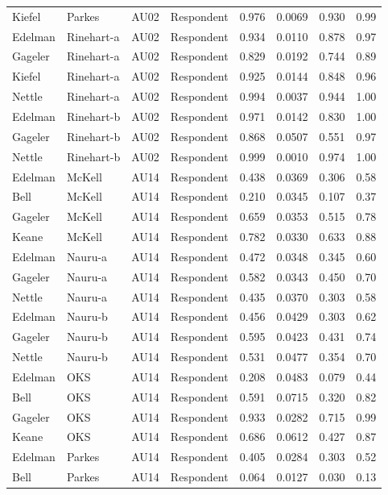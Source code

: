 \documentclass{monashthesis}
\begin{document}
\begin{center}
\begin{longtable}{llllllll}
Kiefel & Parkes & AU02 & Respondent & 0.976 & 0.0069 & 0.930 & 0.99 \\
Edelman & Rinehart-a & AU02 & Respondent & 0.934 & 0.0110 & 0.878 & 0.97 \\
Gageler & Rinehart-a & AU02 & Respondent & 0.829 & 0.0192 & 0.744 & 0.89 \\
Kiefel & Rinehart-a & AU02 & Respondent & 0.925 & 0.0144 & 0.848 & 0.96 \\
Nettle & Rinehart-a & AU02 & Respondent & 0.994 & 0.0037 & 0.944 & 1.00 \\
Edelman & Rinehart-b & AU02 & Respondent & 0.971 & 0.0142 & 0.830 & 1.00 \\
Gageler & Rinehart-b & AU02 & Respondent & 0.868 & 0.0507 & 0.551 & 0.97 \\
Nettle & Rinehart-b & AU02 & Respondent & 0.999 & 0.0010 & 0.974 & 1.00 \\
Edelman & McKell & AU14 & Respondent & 0.438 & 0.0369 & 0.306 & 0.58 \\
Bell & McKell & AU14 & Respondent & 0.210 & 0.0345 & 0.107 & 0.37 \\
Gageler & McKell & AU14 & Respondent & 0.659 & 0.0353 & 0.515 & 0.78 \\
Keane & McKell & AU14 & Respondent & 0.782 & 0.0330 & 0.633 & 0.88 \\
Edelman & Nauru-a & AU14 & Respondent & 0.472 & 0.0348 & 0.345 & 0.60 \\
Gageler & Nauru-a & AU14 & Respondent & 0.582 & 0.0343 & 0.450 & 0.70 \\
Nettle & Nauru-a & AU14 & Respondent & 0.435 & 0.0370 & 0.303 & 0.58 \\
Edelman & Nauru-b & AU14 & Respondent & 0.456 & 0.0429 & 0.303 & 0.62 \\
Gageler & Nauru-b & AU14 & Respondent & 0.595 & 0.0423 & 0.431 & 0.74 \\
Nettle & Nauru-b & AU14 & Respondent & 0.531 & 0.0477 & 0.354 & 0.70 \\
Edelman & OKS & AU14 & Respondent & 0.208 & 0.0483 & 0.079 & 0.44 \\
Bell & OKS & AU14 & Respondent & 0.591 & 0.0715 & 0.320 & 0.82 \\
Gageler & OKS & AU14 & Respondent & 0.933 & 0.0282 & 0.715 & 0.99 \\
Keane & OKS & AU14 & Respondent & 0.686 & 0.0612 & 0.427 & 0.87 \\
Edelman & Parkes & AU14 & Respondent & 0.405 & 0.0284 & 0.303 & 0.52 \\
Bell & Parkes & AU14 & Respondent & 0.064 & 0.0127 & 0.030 & 0.13 \\

\end{longtable}
\end{center}
\end{document}
